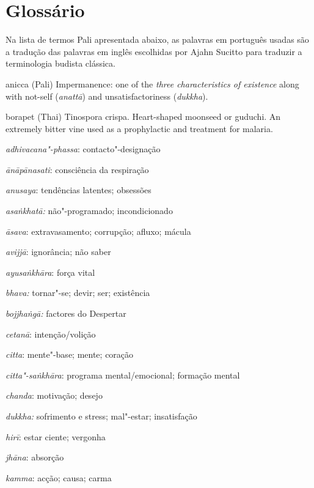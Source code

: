 \chapter{Glossário}

Na lista de termos Pali apresentada abaixo, as palavras em português usadas são
a tradução das palavras em inglês escolhidas por Ajahn Sucitto para traduzir a
terminologia budista clássica.

\begin{glossarydescription}


\item[anicca] (Pali) Impermanence: one of the \emph{three characteristics of
    existence} along with not-self (\emph{anattā}) and unsatisfactoriness
  (\emph{dukkha}).


\item[borapet] (Thai) Tinospora crispa. Heart-shaped moonseed or guduchi.
  An extremely bitter vine used as a prophylactic and treatment for malaria.

  \emph{adhivacana"-phassa}: contacto"-designação

  \emph{ānāpānasati}: consciência da respiração

  \emph{anusaya}: tendências latentes; obsessões

  \emph{asaṅkhatā:} não"-programado; incondicionado

  \emph{āsava}: extravasamento; corrupção; afluxo; mácula

  \emph{avijjā}: ignorância; não saber

  \emph{ayusaṅkhāra}: força vital

  \emph{bhava:} tornar"-se; devir; ser; existência

  \emph{bojjhaṅgā:} factores do Despertar

  \emph{cetanā}: intenção/volição

  \emph{citta}: mente"-base; mente; coração

  \emph{citta"-saṅkhāra}: programa mental/emocional; formação mental

  \emph{chanda}: motivação; desejo

  \emph{dukkha:} sofrimento e stress; mal"-estar; insatisfação

  \emph{hirī}: estar ciente; vergonha

  \emph{jhāna}: absorção

  \emph{kamma}: acção; causa; carma


\end{glossarydescription}
